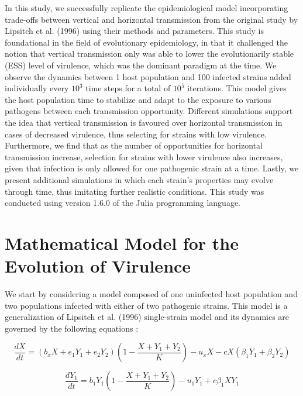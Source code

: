 In this study, we successfully replicate the epidemiological model incorporating trade-offs between vertical and horizontal transmission from the original study by Lipsitch et al. (1996)\supercite{Lipsitch:1996} using their methods and parameters.
This study is foundational in the field of evolutionary epidemiology, in that it challenged the notion that vertical transmission only was able to lower the evolutionarily stable (ESS) level of virulence, which was the dominant paradigm at the time.
We observe the dynamics between 1 host population and 100 infected strains added individually every $10^3$ time steps for a total of $10^5$ iterations.
This model gives the host population time to stabilize and adapt to the exposure to various pathogens between each transmission opportunity.
Different simulations support the idea that vertical transmission is favoured over horizontal transmission in cases of decreased virulence, thus selecting for strains with low virulence.
Furthermore, we find that as the number of opportunities for horizontal transmission increase, selection for strains with lower virulence also increases, given that infection is only allowed for one pathogenic strain at a time.
Lastly, we present additional simulations in which each strain’s properties may evolve through time, thus imitating further realistic conditions.
This study was conducted using version 1.6.0 of the Julia programming language.

\section{Mathematical Model for the Evolution of Virulence}

We start by considering a model composed of one uninfected host population and two populations infected with either of two pathogenic strains. This model is a generalization of Lipsitch et al. (1996)\supercite{Lipsitch:1996} single-strain model and its dynamics are governed by the following equations : 

\begin{equation}
\frac{dX}{dt} = (b_x X + e_1 Y_1 + e_2 Y_2)(1 - \frac{X + Y_1 + Y_2}{K}) - u_x X - c X(\beta_1 Y_1 + \beta_2 Y_2)
\label{eqn:1}
\end{equation}

\begin{equation}
\frac{dY_1}{dt} = b_1 Y_1(1 - \frac{X + Y_1 + Y_2}{K}) - u_1 Y_1 + c\beta_1 X Y_1
\label{eqn:2}
\end{equation}

